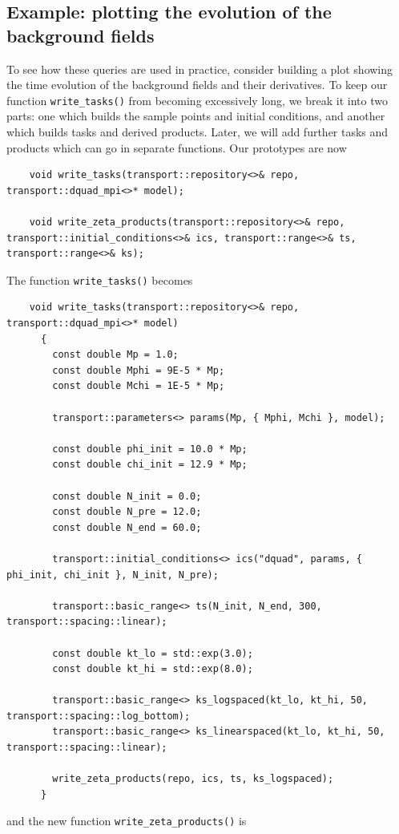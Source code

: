 \documentclass[11pt,a4paper]{article}
\begin{document}
\subsection{Example: plotting the evolution of the background fields}
\label{sec:example-backg-evolve}
To see how these queries are used in practice,
consider building a plot showing the time evolution of the background
fields and their derivatives.
To keep our function
\texttt{write_tasks()} from becoming excessively long, we break it
into two parts: one which builds the sample points and initial conditions,
and another which builds tasks and derived products.
Later, we will add further tasks and products which can go in separate functions.
Our prototypes are now
\begin{verbatim}
	void write_tasks(transport::repository<>& repo, transport::dquad_mpi<>* model);
	
	void write_zeta_products(transport::repository<>& repo, transport::initial_conditions<>& ics, transport::range<>& ts, transport::range<>& ks);	
\end{verbatim}
The function \texttt{write_tasks()} becomes
\begin{verbatim}
	void write_tasks(transport::repository<>& repo, transport::dquad_mpi<>* model)
	  {
	    const double Mp = 1.0;
	    const double Mphi = 9E-5 * Mp;
	    const double Mchi = 1E-5 * Mp;
	
	    transport::parameters<> params(Mp, { Mphi, Mchi }, model);
	
	    const double phi_init = 10.0 * Mp;
	    const double chi_init = 12.9 * Mp;
	
	    const double N_init = 0.0;
	    const double N_pre = 12.0;
	    const double N_end = 60.0;
	
	    transport::initial_conditions<> ics("dquad", params, { phi_init, chi_init }, N_init, N_pre);
	
	    transport::basic_range<> ts(N_init, N_end, 300, transport::spacing::linear);
	
	    const double kt_lo = std::exp(3.0);
	    const double kt_hi = std::exp(8.0);
	
	    transport::basic_range<> ks_logspaced(kt_lo, kt_hi, 50, transport::spacing::log_bottom);
	    transport::basic_range<> ks_linearspaced(kt_lo, kt_hi, 50, transport::spacing::linear);
	
	    write_zeta_products(repo, ics, ts, ks_logspaced);
	  }
\end{verbatim}
and the new function
\texttt{write_zeta_products()} is
\end{document}
